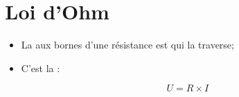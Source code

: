 \documentclass[12pt,a4paper]{article}
\begin{document}
\section{Loi d'Ohm}


	\begin{mybilan}
		\begin{itemize}
			\item La  aux bornes d'une résistance est  qui la traverse;
			
			\item C'est la  :
			
			\begin{equation*}
				U = R \times I
			\end{equation*}
		\end{itemize}
	\end{mybilan}
%
\end{document}
